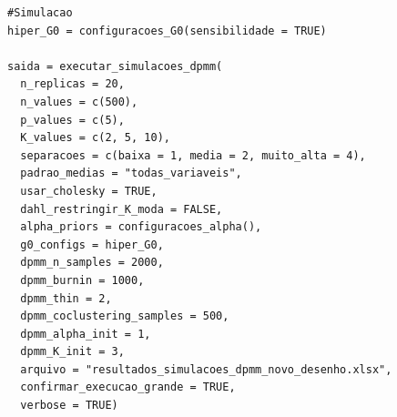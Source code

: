 \begin{verbatim}
#Simulacao
hiper_G0 = configuracoes_G0(sensibilidade = TRUE)

saida = executar_simulacoes_dpmm(
  n_replicas = 20,
  n_values = c(500),
  p_values = c(5),
  K_values = c(2, 5, 10),
  separacoes = c(baixa = 1, media = 2, muito_alta = 4),
  padrao_medias = "todas_variaveis",
  usar_cholesky = TRUE,      
  dahl_restringir_K_moda = FALSE,
  alpha_priors = configuracoes_alpha(),
  g0_configs = hiper_G0,
  dpmm_n_samples = 2000,
  dpmm_burnin = 1000,
  dpmm_thin = 2,
  dpmm_coclustering_samples = 500,
  dpmm_alpha_init = 1,
  dpmm_K_init = 3,
  arquivo = "resultados_simulacoes_dpmm_novo_desenho.xlsx",
  confirmar_execucao_grande = TRUE,
  verbose = TRUE)
\end{verbatim}